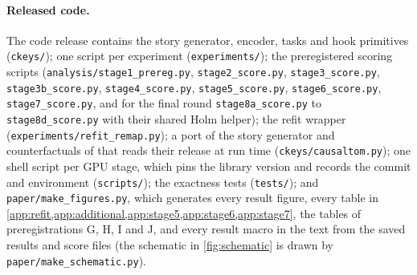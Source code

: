 \paragraph{Released code.} The code release contains the story generator, encoder, tasks and hook primitives (\texttt{ckeys/}); one script per experiment (\texttt{experiments/}); the preregistered scoring scripts (\texttt{analysis/stage1\_prereg.py}, \texttt{stage2\_score.py}, \texttt{stage3\_score.py}, \texttt{stage3b\_score.py}, \texttt{stage4\_score.py}, \texttt{stage5\_score.py}, \texttt{stage6\_score.py}, \texttt{stage7\_score.py}, and for the final round \texttt{stage8a\_score.py} to \texttt{stage8d\_score.py} with their shared Holm helper); the refit wrapper (\texttt{experiments/refit\_remap.py}); a port of the story generator and counterfactuals of \citet{prakash2025lookbacks} that reads their release at run time (\texttt{ckeys/causaltom.py}); one shell script per GPU stage, which pins the library version and records the commit and environment (\texttt{scripts/}); the exactness tests (\texttt{tests/}); and \texttt{paper/make\_figures.py}, which generates every result figure, every table in \cref{app:refit,app:additional,app:stage5,app:stage6,app:stage7}, the tables of preregistrations G, H, I and J, and every result macro in the text from the saved results and score files (the schematic in \cref{fig:schematic} is drawn by \texttt{paper/make\_schematic.py}).
